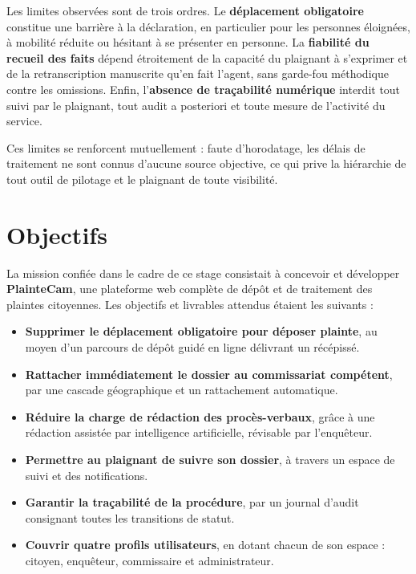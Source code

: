 Les limites observées sont de trois ordres. Le \textbf{déplacement obligatoire} constitue une barrière à la déclaration, en particulier pour les personnes éloignées, à mobilité réduite ou hésitant à se présenter en personne. La \textbf{fiabilité du recueil des faits} dépend étroitement de la capacité du plaignant à s'exprimer et de la retranscription manuscrite qu'en fait l'agent, sans garde-fou méthodique contre les omissions. Enfin, l'\textbf{absence de traçabilité numérique} interdit tout suivi par le plaignant, tout audit a posteriori et toute mesure de l'activité du service.

Ces limites se renforcent mutuellement : faute d'horodatage, les délais de traitement ne sont connus d'aucune source objective, ce qui prive la hiérarchie de tout outil de pilotage et le plaignant de toute visibilité.

\section*{Objectifs}

La mission confiée dans le cadre de ce stage consistait à concevoir et développer \textbf{PlainteCam}, une plateforme web complète de dépôt et de traitement des plaintes citoyennes. Les objectifs et livrables attendus étaient les suivants :

\begin{itemize}
    \item[--] \textbf{Supprimer le déplacement obligatoire pour déposer plainte}, au moyen d'un parcours de dépôt guidé en ligne délivrant un récépissé.
    \item[--] \textbf{Rattacher immédiatement le dossier au commissariat compétent}, par une cascade géographique et un rattachement automatique.
    \item[--] \textbf{Réduire la charge de rédaction des procès-verbaux}, grâce à une rédaction assistée par intelligence artificielle, révisable par l'enquêteur.
    \item[--] \textbf{Permettre au plaignant de suivre son dossier}, à travers un espace de suivi et des notifications.
    \item[--] \textbf{Garantir la traçabilité de la procédure}, par un journal d'audit consignant toutes les transitions de statut.
    \item[--] \textbf{Couvrir quatre profils utilisateurs}, en dotant chacun de son espace : citoyen, enquêteur, commissaire et administrateur.
\end{itemize}

